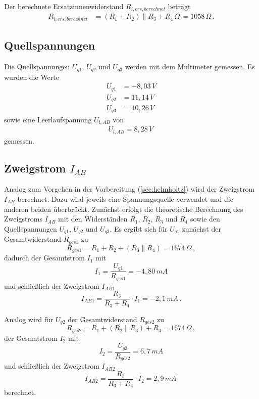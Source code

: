 Der berechnete Ersatzinnenwiderstand $R_{i,ers,berechnet}$ beträgt
\begin{align*}
    R_{i,ers,berechnet} & = \left(R_1+R_2\right)\parallel{R_3+R_4}\,\Omega\,
    = 1058\,\Omega\, .
\end{align*}

\subsection{Quellspannungen}
Die Quellspannungen $U_{q1}$, $U_{q2}$ und $U_{q3}$ werden mit dem Multimeter gemessen. Es wurden die Werte
\begin{align*}
    U_{q1} & = -8,03\,V \\
    U_{q2} & = 11,14\,V \\
    U_{q3} & = 10,26\,V
\end{align*}
sowie eine Leerlaufspannung $U_{l,AB}$ von
\begin{align*}
    U_{l,AB}=8,28\,V\,
\end{align*}
gemessen.

\subsection{Zweigstrom $I_{AB}$}
Analog zum Vorgehen in der Vorbereitung (\ref{sec:helmholtz}) wird der Zweigstrom $I_{AB}$ berechnet. Dazu wird jeweils eine Spannungsquelle verwendet und die anderen beiden überbrückt. Zunächst erfolgt die theoretische Berechnung des Zweigstroms $I_{AB}$ mit den Widerständen $R_1$, $R_2$, $R_3$ und $R_4$ sowie den Quellspannungen $U_{q1}$, $U_{q2}$ und $U_{q3}$. Es ergibt sich für $U_{q1}$ zunächst der Gesamtwiderstand $R_{ges1}$ zu
\begin{equation*}
    R_{ges1}=R_1+R_2+(R_3\parallel R_4)=1674\,\Omega\, ,
\end{equation*}
dadurch der Gesamtstrom $I_{1}$ mit
\begin{equation*}
    I_{1}=\frac{U_{q1}}{R_{ges1}}=-4,80\,mA
\end{equation*}
und schließlich der Zweigstrom $I_{AB1}$
\begin{equation}
    \label{eq:zweigstrom1}
    I_{AB1}=\frac{R_3}{R_3+R_4}\cdot I_{1}=-2,1\,mA\, .
\end{equation}

Analog wird für $U_{q2}$ der Gesamtwiderstand $R_{ges2}$ zu
\begin{equation*}
    R_{ges2}=R_1+(R_2\parallel R_3)+R_4=1674\,\Omega\, ,
\end{equation*}
der Gesamtstrom $I_{2}$ mit
\begin{equation*}
    I_{2}=\frac{U_{q2}}{R_{ges2}}=6,7\,mA
\end{equation*}
und schließlich der Zweigstrom $I_{AB2}$
\begin{equation}
    \label{eq:zweigstrom2}
    I_{AB2}=\frac{R_3}{R_3+R_4}\cdot I_{2}=2,9\,mA\,
\end{equation}
berechnet.


